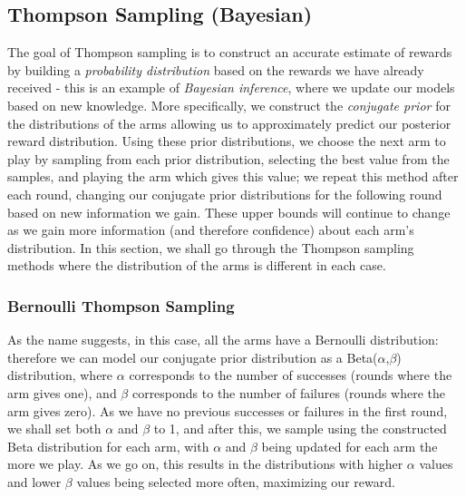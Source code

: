 \subsection{Thompson Sampling (Bayesian)}
The goal of Thompson sampling is to construct an accurate estimate of rewards by building a \emph{probability distribution} based on the rewards we have already received - this is an example of \emph{Bayesian inference}, where we update our models based on new knowledge. More specifically, we construct the \emph{conjugate prior} for the distributions of the arms allowing us to approximately predict our posterior reward distribution. Using these prior distributions, we choose the next arm to play by sampling from each prior distribution, selecting the best value from the samples, and playing the arm which gives this value; we repeat this method after each round, changing our conjugate prior distributions for the following round based on new information we gain. These upper bounds will continue to change as we gain more information (and therefore confidence) about each arm's distribution.  In this section, we shall go through the Thompson sampling methods where the distribution of the arms is different in each case. \citep{agrawal2012analysis} 

\subsubsection{Bernoulli Thompson Sampling}
As the name suggests, in this case, all the arms have a Bernoulli distribution: therefore we can model our conjugate prior distribution as a Beta($\alpha$,$\beta$) distribution, where $\alpha$ corresponds to the number of successes (rounds where the arm gives one), and $\beta$ corresponds to the number of failures (rounds where the arm gives zero). As we have no previous successes or failures in the first round, we shall set both $\alpha$ and $\beta$ to 1, and after this, we sample using the constructed Beta distribution for each arm, with $\alpha$ and $\beta$ being updated for each arm the more we play. As we go on, this results in the distributions with higher $\alpha$ values and lower $\beta$ values being selected more often, maximizing our reward. 

